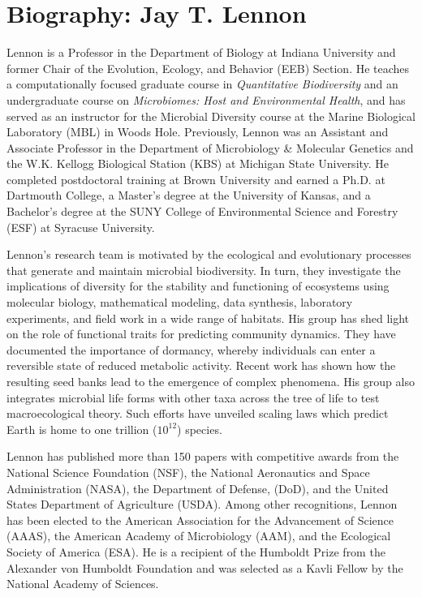 \documentclass[11pt]{article}
\begin{document}
\section*{Biography: Jay T. Lennon}

Lennon is a Professor in the Department of Biology at Indiana University and former Chair of the Evolution, Ecology, and Behavior (EEB) Section. He teaches a computationally focused graduate course in \textit{Quantitative Biodiversity} and an undergraduate course on \textit{Microbiomes: Host and Environmental Health}, and has served as an instructor for the Microbial Diversity course at the Marine Biological Laboratory (MBL) in Woods Hole. Previously, Lennon was an Assistant and Associate Professor in the Department of Microbiology \& Molecular Genetics and the W.K. Kellogg Biological Station (KBS) at Michigan State University. He completed postdoctoral training at Brown University and earned a Ph.D. at Dartmouth College, a Master’s degree at the University of Kansas, and a Bachelor’s degree at the SUNY College of Environmental Science and Forestry (ESF) at Syracuse University.

Lennon’s research team is motivated by the ecological and evolutionary processes that generate and maintain microbial biodiversity. In turn, they investigate the implications of diversity for the stability and functioning of ecosystems using molecular biology, mathematical modeling, data synthesis, laboratory experiments, and field work in a wide range of habitats. His group has shed light on the role of functional traits for predicting community dynamics. They have documented the importance of dormancy, whereby individuals can enter a reversible state of reduced metabolic activity. Recent work has shown how the resulting seed banks lead to the emergence of complex phenomena. His group also integrates microbial life forms with other taxa across the tree of life to test macroecological theory. Such efforts have unveiled scaling laws which predict Earth is home to one trillion ($10^{12}$) species.

Lennon has published more than 150 papers with competitive awards from the National Science Foundation (NSF), the National Aeronautics and Space Administration (NASA), the Department of Defense, (DoD), and the United States Department of Agriculture (USDA). Among other recognitions, Lennon has been elected to the American Association for the Advancement of Science (AAAS), the American Academy of Microbiology (AAM), and the Ecological Society of America (ESA). He is a recipient of the Humboldt Prize from the Alexander von Humboldt Foundation and was selected as a Kavli Fellow by the National Academy of Sciences. 
\end{document}
